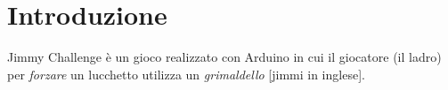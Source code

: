 \chapter{Introduzione}

Jimmy Challenge è un gioco realizzato con Arduino in cui il giocatore (il ladro) per \textit{forzare} un lucchetto utilizza un \textit{grimaldello} [jimmi in inglese].
